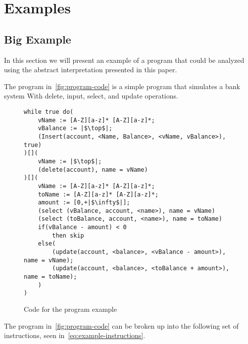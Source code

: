 \section{Examples}\label{sec:example}

\subsection{Big Example}\label{subsec:big-example}
In this section we will present an example of a program that could be analyzed using the abstract interpretation presented in this paper.

The program in~\autoref{fig:program-code} is a simple program that simulates a bank system With delete, input, select, and update operations.
\begin{figure}
    \begin{verbatim}
while true do(
    vName := [A-Z][a-z]* [A-Z][a-z]*;
    vBalance := |$\top$|;
    (Insert(account, <Name, Balance>, <vName, vBalance>), true)
)[](
    vName := |$\top$|;
    (delete(account), name = vName)
)[](
    vName := [A-Z][a-z]* [A-Z][a-z]*;
    toName := [A-Z][a-z]* [A-Z][a-z]*;
    amount := [0,+|$\infty$|];
    (select (vBalance, account, <name>), name = vName)
    (select (toBalance, account, <name>), name = toName)
    if(vBalance - amount) < 0
        then skip
    else(
        (update(account, <balance>, <vBalance - amount>), name = vName);
        (update(account, <balance>, <toBalance + amount>), name = toName);
    )
)
    \end{verbatim}
    \caption{Code for the program example}
    \label{fig:program-code}
\end{figure}

The program in~\autoref{fig:program-code} can be broken up into the following set of instructions, seen in~\autoref{eq:example-instructions}.

